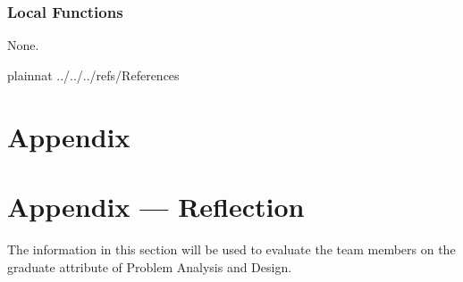 \documentclass[12pt, titlepage]{article}
\begin{document}
\subsubsection{Local Functions}

None.

\newpage

 {plainnat}
 {../../../refs/References}

\newpage

\section{Appendix} \label{Appendix}


\newpage{}

\section*{Appendix --- Reflection}


The information in this section will be used to evaluate the team members on the
graduate attribute of Problem Analysis and Design.


\end{document}
